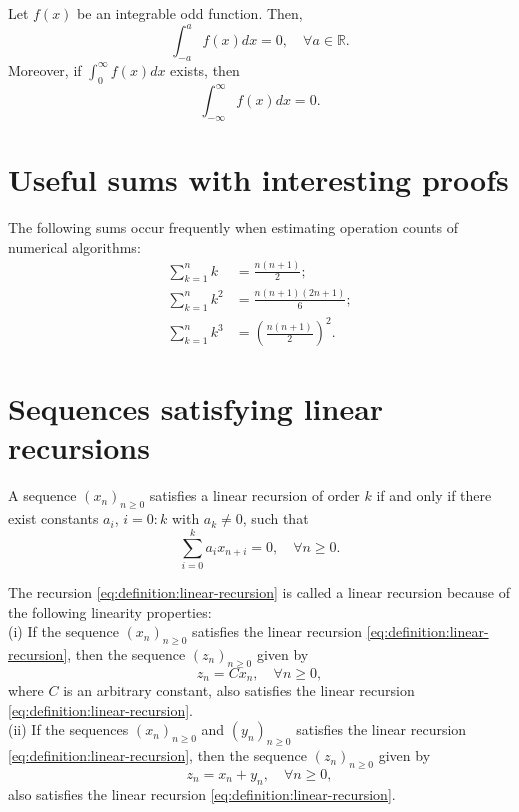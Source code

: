 \begin{lemma}
    Let $ f(x) $ be an integrable odd function. Then,
    \begin{equation}
        \int_{-a}^{a} f(x) dx = 0, \quad \forall a \in \mathbb{R}.
    \end{equation}
    Moreover, if $ \int_{0}^{\infty} f(x) dx $ exists, then
    \begin{equation}
        \int_{-\infty}^{\infty} f(x) dx = 0.
    \end{equation}
\end{lemma}

\section{Useful sums with interesting proofs}
The following sums occur frequently when estimating operation counts of
    numerical algorithms:
\begin{align}
    \sum_{k=1}^{n} k &= \frac{n (n + 1)}{2}; \label{eq:sum-pow1} \\
    \sum_{k=1}^{n} k^2 &= \frac{n (n + 1) (2 n + 1)}{6}; \label{eq:sum-pow2} \\
    \sum_{k=1}^{n} k^3 &= \left( \frac{n (n + 1)}{2} \right)^2.
        \label{eq:sum-pow3}
\end{align}

\section{Sequences satisfying linear recursions}
\begin{definition}
    A sequence $ (x_n)_{n \geq 0} $ satisfies a linear recursion of order $ k $         if and only if there exist constants $ a_i $, $ i = 0 : k $ with
        $ a_k \neq 0 $, such that
    \begin{equation}
        \sum_{i=0}^{k} a_i x_{n+i} = 0, \quad \forall n \geq 0.
        \label{eq:definition:linear-recursion}
    \end{equation}
\end{definition}

The recursion \eqref{eq:definition:linear-recursion} is called a linear
    recursion because of the following linearity properties: \\
(i) If the sequence $ (x_n)_{n \geq 0} $ satisfies the linear recursion
    \eqref{eq:definition:linear-recursion}, then the sequence
    $ (z_n)_{n \geq 0} $ given by
\begin{equation}
    z_n = C x_n, \quad \forall n \geq 0,
\end{equation}
where $ C $ is an arbitrary constant, also satisfies the linear recursion
    \eqref{eq:definition:linear-recursion}.\\
(ii) If the sequences $ (x_n)_{n \geq 0} $ and $ (y_n)_{n \geq 0} $ satisfies
    the linear recursion \eqref{eq:definition:linear-recursion}, then the
    sequence $ (z_n)_{n \geq 0} $ given by
\begin{equation}
    z_n = x_n + y_n, \quad \forall n \geq 0,
\end{equation}
also satisfies the linear recursion \eqref{eq:definition:linear-recursion}.

